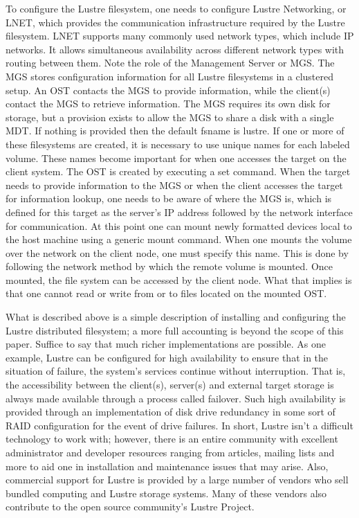 \documentclass[11pt]{article}
\begin{document}
To configure the Lustre filesystem, one needs to configure Lustre Networking, 
or LNET, which provides the communication infrastructure required by the 
Lustre filesystem. LNET supports many commonly used network types, which 
include IP  networks. It allows simultaneous availability across different 
network types with routing between them. Note the role of the Management 
Server or MGS. The MGS stores configuration information for all Lustre 
filesystems in a clustered setup. An OST contacts the MGS to provide 
information, while the client(s) contact the MGS to retrieve information. 
The MGS requires its own disk for storage, but a provision exists to allow 
the MGS to share a disk with a single MDT. If nothing is provided then the 
default fsname is lustre. If one or more of these filesystems are created, 
it is necessary to use unique names for each labeled volume. These names 
become   important for when one accesses the target on the client system.
The OST is created by executing a set command. When the target needs to 
provide information to the MGS or when the client  accesses the target for 
information lookup, one needs to be aware of where the MGS is, which is 
defined for this target as the server's IP address followed by the network 
interface for communication. At this point one can mount newly formatted 
devices local to the host machine using a generic mount command. When one 
mounts the volume over the network on the client node, one must 
specify this name. This is done by following the network method by which 
the remote volume is mounted. Once mounted, the file system can be accessed 
by the client node. What that implies is that one cannot read or write from 
or to files located on the mounted OST. 

What is described above is a simple description of installing and 
configuring the Lustre distributed filesystem;  a more full accounting 
is beyond the scope of this paper. Suffice to say that much richer 
implementations are possible. As one example, Lustre can be configured 
for high availability to ensure that in the situation of failure, the 
system's services continue without interruption. That is, the 
accessibility between the client(s), server(s) and external target 
storage is always made available through a process called failover. 
Such high availability is provided through an implementation of disk 
drive redundancy in some sort of RAID configuration for the event of 
drive failures. In short, Lustre isn't a difficult technology to work 
with; however, there is an entire community with excellent administrator 
and developer resources ranging from articles, mailing lists and more 
to aid one in installation and maintenance issues that may arise. Also, 
commercial support for Lustre is provided by a large number of vendors 
who sell bundled computing and Lustre storage systems. Many of these 
vendors also contribute to the open source community's Lustre Project. 
\end{document}
